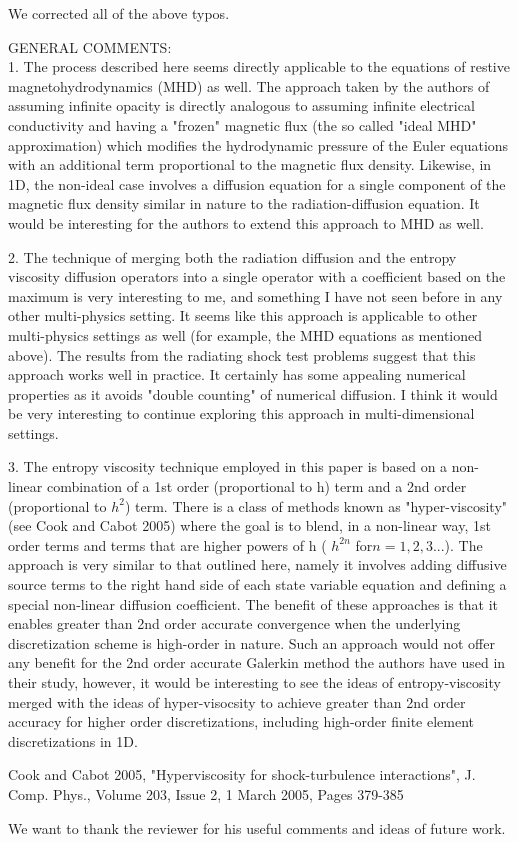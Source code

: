 \documentclass{article}
\begin{document}
We corrected all of the above typos.
\bigskip


{
\color{blue}
\noindent
GENERAL COMMENTS: \\
1. The process described here seems directly applicable to the equations of restive magnetohydrodynamics (MHD) as well. The approach taken by the authors of assuming infinite opacity is directly analogous to assuming infinite electrical conductivity and having a "frozen" magnetic flux (the so called "ideal MHD" approximation) which modifies the hydrodynamic pressure of the Euler equations with an additional term proportional to the magnetic flux density. Likewise, in 1D, the non-ideal case involves a diffusion equation for a single component of the magnetic flux density similar in nature to the radiation-diffusion equation. It would be interesting for the authors to extend this approach to MHD as well.}
\bigskip


{
\color{blue}
2. The technique of merging both the radiation diffusion and the entropy viscosity diffusion operators into a single operator with a coefficient based on the maximum is very interesting to me, and something I have not seen before in any other multi-physics setting. It seems like this approach is applicable to other multi-physics settings as well (for example, the MHD equations as mentioned above). The results from the radiating shock test problems suggest that this approach works well in practice. It certainly has some appealing numerical properties as it avoids "double counting" of numerical diffusion. I think it would be very interesting to continue exploring this approach in multi-dimensional settings.
}
\bigskip


{
\color{blue}
3. The entropy viscosity technique employed in this paper is based on a non-linear combination of a 1st order (proportional to h) term and a 2nd order (proportional to $h^2$) term. There is a class of methods known as "hyper-viscosity" (see Cook and Cabot 2005) where the goal is to blend, in a non-linear way, 1st order terms and terms that are higher powers of h ( $h^{2n}$ for$ n = 1,2,3$...). The approach is very similar to that outlined here, namely it involves adding diffusive source terms to the right hand side of each state variable equation and defining a special non-linear diffusion coefficient. The benefit of these approaches is that it enables greater than 2nd order accurate convergence when the underlying discretization scheme is high-order in nature. Such an approach would not offer any benefit for the 2nd order accurate Galerkin method the authors have used in their study, however, it would be interesting to see the ideas of entropy-viscosity merged with the ideas of
hyper-visocsity to achieve greater than 2nd order accuracy for higher order discretizations, including high-order finite element discretizations in 1D.

Cook and Cabot 2005, "Hyperviscosity for shock-turbulence interactions", J. Comp. Phys., Volume 203, Issue 2, 1 March 2005, Pages 379-385
}
\bigskip

We want to thank the reviewer for his useful comments and ideas of future work.
\end{document}
